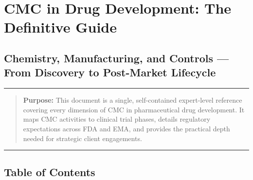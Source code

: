 \documentclass[
  11pt,
  a4paper,
]{report}
\begin{document}
\setcounter{tocdepth}{2}
{
\hypersetup{linkcolor=blue}
\tableofcontents
}
\hypertarget{cmc-in-drug-development-the-definitive-guide}{%
\chapter{CMC in Drug Development: The Definitive
Guide}\label{cmc-in-drug-development-the-definitive-guide}}

\hypertarget{chemistry-manufacturing-and-controls-from-discovery-to-post-market-lifecycle}{%
\section{Chemistry, Manufacturing, and Controls --- From Discovery to
Post-Market
Lifecycle}\label{chemistry-manufacturing-and-controls-from-discovery-to-post-market-lifecycle}}

\begin{center}\rule{0.5\linewidth}{0.5pt}\end{center}

\begin{quote}
\textbf{Purpose:} This document is a single, self-contained expert-level
reference covering every dimension of CMC in pharmaceutical drug
development. It maps CMC activities to clinical trial phases, details
regulatory expectations across FDA and EMA, and provides the practical
depth needed for strategic client engagements.
\end{quote}

\begin{center}\rule{0.5\linewidth}{0.5pt}\end{center}

\hypertarget{table-of-contents}{%
\section{Table of Contents}\label{table-of-contents}}
\end{document}
